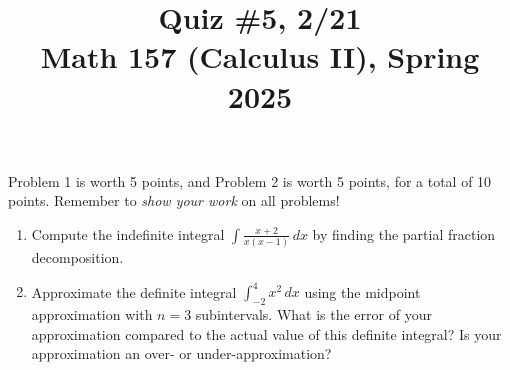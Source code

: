 \documentclass[11pt]{article}
\title{Quiz \#5, 2/21 \\ Math 157 (Calculus II), Spring 2025}
\date{}
\begin{document}
\maketitle

\thispagestyle{empty}

\vspace{-2cm}

Problem 1 is worth 5 points, and Problem 2 is worth 5 points, for a total of 10 points. Remember to \emph{show your work} on all problems!

\begin{enumerate}
\item Compute the indefinite integral $\displaystyle \int \frac{x+2}{x(x-1)} \, dx$ by finding the partial fraction decomposition.

\vspace{7.5cm}

\item Approximate the definite integral $\displaystyle \int_{-2}^{4} x^2 \, dx$ using the midpoint approximation with $n=3$ subintervals. What is the error of your approximation compared to the actual value of this definite integral? Is your approximation an over- or under-approximation?

\end{enumerate}
\end{document}
